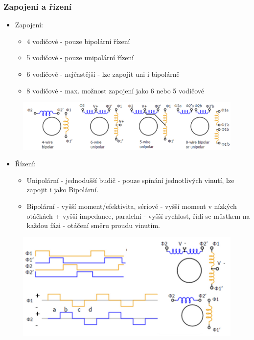 \subsubsection*{Zapojení a řízení}
\begin{itemize}
    \item Zapojení: \begin{itemize}
              \item 4 vodičové - pouze bipolární řízení
              \item 5 vodičové - pouze unipolární řízení
              \item 6 vodičově - nejčastější - lze zapojit uni i bipolárně
              \item 8 vodičové - max. možnost zapojení jako 6 nebo 5 vodičové
          \end{itemize}
\end{itemize}

\begin{figure}[h]
    \begin{center}
        \includegraphics[scale = 1]{img/picture8.png}
    \end{center}
\end{figure}

\begin{itemize}
    \item Řízení: \begin{itemize}
              \item Unipolární - jednodušší budič - pouze spínání jednotlivých vinutí, lze zapojit i jako Bipolární.
              \item Bipolární - vyšší moment/efektivita, sériové - vyšší moment v nízkých otáčkách + vyšší impedance, paralelní - vyšší rychlost, řídí se můstkem na každou fázi - otáčení směru proudu vinutím.
          \end{itemize}
\end{itemize}

\begin{figure}[h]
    \begin{center}
        \includegraphics[scale = 1]{img/Picture9.png}
    \end{center}
\end{figure}

